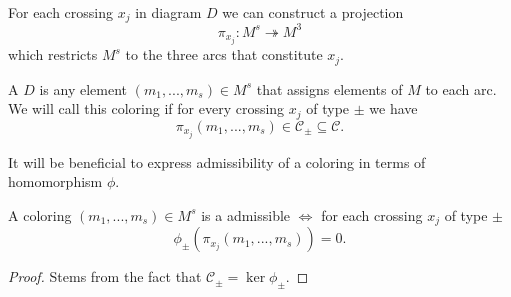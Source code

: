For each crossing $x_j$ in diagram $D$ we can construct a projection 
$$\pi_{x_j}:M^s\twoheadrightarrow M^3$$
which restricts $M^s$ to the three arcs that constitute $x_j$.

\begin{definition}
  A  $D$ is any element $(m_1,..., m_s)\in M^s$ that assigns elements of $M$ to each arc. We will call this coloring  if for every crossing $x_j$ of type $\pm$ we have 
  $$\pi_{x_j}(m_1,..., m_s)\in \mathcal{C}_\pm\subseteq\mathcal{C}.$$
\end{definition}


It will be beneficial to express admissibility of a coloring in terms of homomorphism $\phi$.
\begin{proposition}
  A coloring $(m_1,..., m_s)\in M^s$ is a admissible $\iff$ for each crossing $x_j$ of type $\pm$ 
  $$\phi_\pm(\pi_{x_j}(m_1,...,m_s))=0.$$
\end{proposition}

\begin{proof}
  Stems from the fact that $\mathcal{C}_\pm=\ker\phi_\pm$.
\end{proof}


%
%

